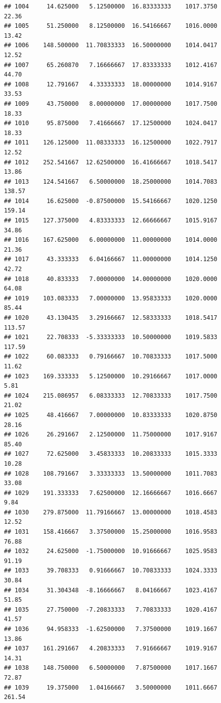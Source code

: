 \documentclass[
]{article}
\begin{document}
\begin{verbatim}
## 1004     14.625000   5.12500000  16.83333333    1017.3750       22.36
## 1005     51.250000   8.12500000  16.54166667    1016.0000       13.42
## 1006    148.500000  11.70833333  16.50000000    1014.0417       12.52
## 1007     65.260870   7.16666667  17.83333333    1012.4167       44.70
## 1008     12.791667   4.33333333  18.00000000    1014.9167       33.53
## 1009     43.750000   8.00000000  17.00000000    1017.7500       18.33
## 1010     95.875000   7.41666667  17.12500000    1024.0417       18.33
## 1011    126.125000  11.08333333  16.12500000    1022.7917       12.52
## 1012    252.541667  12.62500000  16.41666667    1018.5417       13.86
## 1013    124.541667   6.50000000  18.25000000    1014.7083      138.57
## 1014     16.625000  -0.87500000  15.54166667    1020.1250      159.14
## 1015    127.375000   4.83333333  12.66666667    1015.9167       34.86
## 1016    167.625000   6.00000000  11.00000000    1014.0000       21.36
## 1017     43.333333   6.04166667  11.00000000    1014.1250       42.72
## 1018     40.833333   7.00000000  14.00000000    1020.0000       64.08
## 1019    103.083333   7.00000000  13.95833333    1020.0000       85.44
## 1020     43.130435   3.29166667  12.58333333    1018.5417      113.57
## 1021     22.708333  -5.33333333  10.50000000    1019.5833      117.59
## 1022     60.083333   0.79166667  10.70833333    1017.5000       11.62
## 1023    169.333333   5.12500000  10.29166667    1017.0000        5.81
## 1024    215.086957   6.08333333  12.70833333    1017.7500       21.02
## 1025     48.416667   7.00000000  10.83333333    1020.8750       28.16
## 1026     26.291667   2.12500000  11.75000000    1017.9167       85.40
## 1027     72.625000   3.45833333  10.20833333    1015.3333       10.28
## 1028    108.791667   3.33333333  13.50000000    1011.7083       33.08
## 1029    191.333333   7.62500000  12.16666667    1016.6667        9.84
## 1030    279.875000  11.79166667  13.00000000    1018.4583       12.52
## 1031    158.416667   3.37500000  15.25000000    1016.9583       76.88
## 1032     24.625000  -1.75000000  10.91666667    1025.9583       91.19
## 1033     39.708333   0.91666667  10.70833333    1024.3333       30.84
## 1034     31.304348  -8.16666667   8.04166667    1023.4167       51.85
## 1035     27.750000  -7.20833333   7.70833333    1020.4167       41.57
## 1036     94.958333  -1.62500000   7.37500000    1019.1667       13.86
## 1037    161.291667   4.20833333   7.91666667    1019.9167       14.31
## 1038    148.750000   6.50000000   7.87500000    1017.1667       72.87
## 1039     19.375000   1.04166667   3.50000000    1011.6667      261.54

\end{verbatim}
\end{document}
